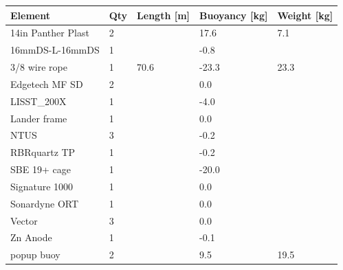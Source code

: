 \documentclass{article}
\begin{document}
\begin{tabularx}{\linewidth}{|l|l|l|l|l|}
\caption{L245 \textcolor{orange}{$\blacksquare$}: Element summary}\\
\hline
\textbf{Element} & \textbf{Qty} & \textbf{Length [m]} & \textbf{Buoyancy [kg]} & \textbf{Weight [kg]} \\
\hline
14in Panther Plast & 2 &  & 17.6 & 7.1 \\ \hline
16mmDS-L-16mmDS & 1 &  & -0.8 &  \\ \hline
3/8 wire rope & 1 & 70.6 & -23.3 & 23.3 \\ \hline
Edgetech MF SD & 2 &  & 0.0 &  \\ \hline
LISST\_200X & 1 &  & -4.0 &  \\ \hline
Lander frame & 1 &  & 0.0 &  \\ \hline
NTUS & 3 &  & -0.2 &  \\ \hline
RBRquartz TP & 1 &  & -0.2 &  \\ \hline
SBE 19+ cage & 1 &  & -20.0 &  \\ \hline
Signature 1000 & 1 &  & 0.0 &  \\ \hline
Sonardyne ORT & 1 &  & 0.0 &  \\ \hline
Vector & 3 &  & 0.0 &  \\ \hline
Zn Anode & 1 &  & -0.1 &  \\ \hline
popup buoy & 2 &  & 9.5 & 19.5 \\ \hline
\end{tabularx}
\end{document}
